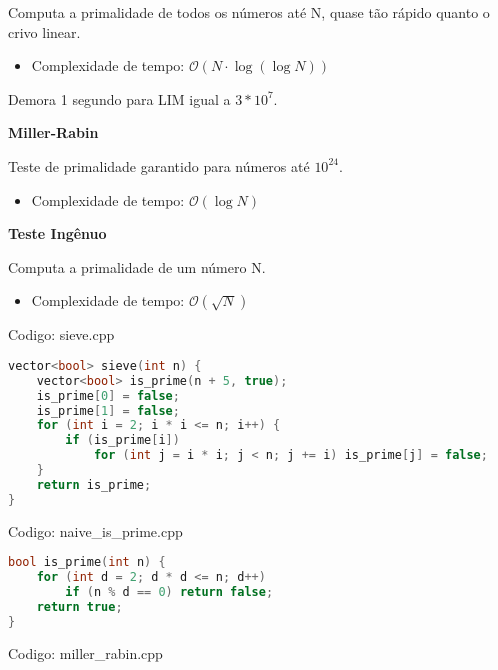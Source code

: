\documentclass[10pt, a4paper, oneside]{book}
\begin{document}
Computa a primalidade de todos os números até N, quase tão rápido quanto o crivo linear.



\begin{itemize}
\item Complexidade de tempo: $\mathcal{O}(N \cdot \log(\log N))$
\end{itemize}



Demora 1 segundo para LIM igual a $3 * 10^7$.



\textbf{Miller-Rabin} 

Teste de primalidade garantido para números até $10^{24}$.



\begin{itemize}
\item Complexidade de tempo: $\mathcal{O}(\log N)$
\end{itemize}



\textbf{Teste Ingênuo} 

Computa a primalidade de um número N.



\begin{itemize}
\item Complexidade de tempo: $\mathcal{O}(\sqrt{N})$
\end{itemize}

\hfill

Codigo: sieve.cpp

\begin{lstlisting}[language=C++]
vector<bool> sieve(int n) {
    vector<bool> is_prime(n + 5, true);
    is_prime[0] = false;
    is_prime[1] = false;
    for (int i = 2; i * i <= n; i++) {
        if (is_prime[i])
            for (int j = i * i; j < n; j += i) is_prime[j] = false;
    }
    return is_prime;
}
\end{lstlisting}
\hfill

Codigo: naive\_is\_prime.cpp

\begin{lstlisting}[language=C++]
bool is_prime(int n) {
    for (int d = 2; d * d <= n; d++)
        if (n % d == 0) return false;
    return true;
}
\end{lstlisting}
\hfill

Codigo: miller\_rabin.cpp
\end{document}
